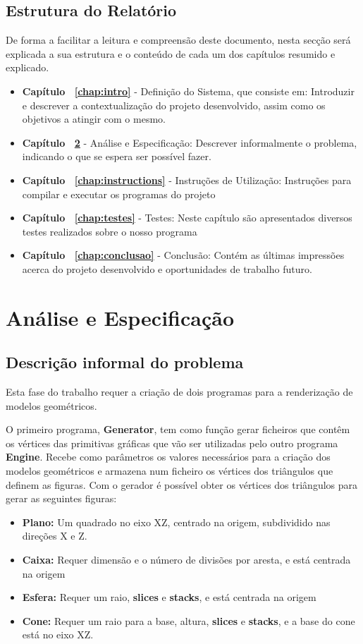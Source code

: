\documentclass[12pt,a4paper]{report}%
\def\titulo#1{\section{#1}}    %
\begin{document}
\newpage
\titulo{Estrutura do Relatório}
De forma a facilitar a leitura e compreensão deste documento, nesta secção será explicada a sua estrutura e o conteúdo de cada um dos capítulos resumido e explicado.

\begin{itemize}
    \item \textbf{Capítulo ~\ref{chap:intro}} - Definição do Sistema, que consiste em: Introduzir e descrever a contextualização do projeto desenvolvido, assim como os objetivos a atingir com o mesmo.
    \item \textbf{Capítulo ~\ref{chap:analiseEspecificacao}} - Análise e Especificação: Descrever informalmente o problema, indicando o que se espera ser possível fazer.
    \item \textbf{Capítulo ~\ref{chap:instructions}} - Instruções de Utilização: Instruções para compilar e executar os programas do projeto
    \item \textbf{Capítulo ~\ref{chap:testes}} - Testes: Neste capítulo são apresentados diversos testes realizados sobre o nosso programa
    \item \textbf{Capítulo ~\ref{chap:conclusao}} - Conclusão: Contém as últimas impressões acerca do projeto desenvolvido e oportunidades de trabalho futuro.
\end{itemize}

\chapter{Análise e Especificação} \label{chap:analiseEspecificacao} %
\section{Descrição informal do problema} \label{sec:descricaoProblema} 
Esta fase do trabalho requer a criação de dois programas para a renderização de modelos geométricos. \par
O primeiro programa, \textbf{Generator}, tem como função gerar ficheiros que contêm os vértices das primitivas gráficas que vão ser utilizadas pelo outro programa \textbf{Engine}. Recebe como parâmetros os valores necessários para a criação dos modelos geométricos e armazena num ficheiro os vértices dos triângulos que definem as figuras. Com o gerador é possível obter os vértices dos triângulos para gerar as seguintes figuras: 
\begin{itemize}
  \item \textbf{Plano:} Um quadrado no eixo XZ, centrado na origem, subdividido nas direções X e Z.
  \item \textbf{Caixa:} Requer dimensão e o número de divisões por aresta, e está centrada na origem
  \item \textbf{Esfera:} Requer um raio, \textbf{slices} e \textbf{stacks}, e está centrada na origem
  \item \textbf{Cone:} Requer um raio para a base, altura, \textbf{slices} e \textbf{stacks}, e a base do cone está no eixo XZ.
\end{itemize}
\end{document}

